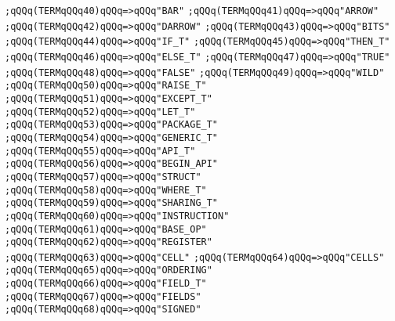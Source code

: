 \verb|;qQQq(TERMqQQq40)qQQq=>qQQq"BAR"|\newline
\verb|;qQQq(TERMqQQq41)qQQq=>qQQq"ARROW"|\newline
\verb|;qQQq(TERMqQQq42)qQQq=>qQQq"DARROW"|\newline
\verb|;qQQq(TERMqQQq43)qQQq=>qQQq"BITS"|\newline
\verb|;qQQq(TERMqQQq44)qQQq=>qQQq"IF_T"|\newline
\verb|;qQQq(TERMqQQq45)qQQq=>qQQq"THEN_T"|\newline
\verb|;qQQq(TERMqQQq46)qQQq=>qQQq"ELSE_T"|\newline
\verb|;qQQq(TERMqQQq47)qQQq=>qQQq"TRUE"|\newline
\verb|;qQQq(TERMqQQq48)qQQq=>qQQq"FALSE"|\newline
\verb|;qQQq(TERMqQQq49)qQQq=>qQQq"WILD"|\newline
\verb|;qQQq(TERMqQQq50)qQQq=>qQQq"RAISE_T"|\newline
\verb|;qQQq(TERMqQQq51)qQQq=>qQQq"EXCEPT_T"|\newline
\verb|;qQQq(TERMqQQq52)qQQq=>qQQq"LET_T"|\newline
\verb|;qQQq(TERMqQQq53)qQQq=>qQQq"PACKAGE_T"|\newline
\verb|;qQQq(TERMqQQq54)qQQq=>qQQq"GENERIC_T"|\newline
\verb|;qQQq(TERMqQQq55)qQQq=>qQQq"API_T"|\newline
\verb|;qQQq(TERMqQQq56)qQQq=>qQQq"BEGIN_API"|\newline
\verb|;qQQq(TERMqQQq57)qQQq=>qQQq"STRUCT"|\newline
\verb|;qQQq(TERMqQQq58)qQQq=>qQQq"WHERE_T"|\newline
\verb|;qQQq(TERMqQQq59)qQQq=>qQQq"SHARING_T"|\newline
\verb|;qQQq(TERMqQQq60)qQQq=>qQQq"INSTRUCTION"|\newline
\verb|;qQQq(TERMqQQq61)qQQq=>qQQq"BASE_OP"|\newline
\verb|;qQQq(TERMqQQq62)qQQq=>qQQq"REGISTER"|\newline
\verb|;qQQq(TERMqQQq63)qQQq=>qQQq"CELL"|\newline
\verb|;qQQq(TERMqQQq64)qQQq=>qQQq"CELLS"|\newline
\verb|;qQQq(TERMqQQq65)qQQq=>qQQq"ORDERING"|\newline
\verb|;qQQq(TERMqQQq66)qQQq=>qQQq"FIELD_T"|\newline
\verb|;qQQq(TERMqQQq67)qQQq=>qQQq"FIELDS"|\newline
\verb|;qQQq(TERMqQQq68)qQQq=>qQQq"SIGNED"|\newline
